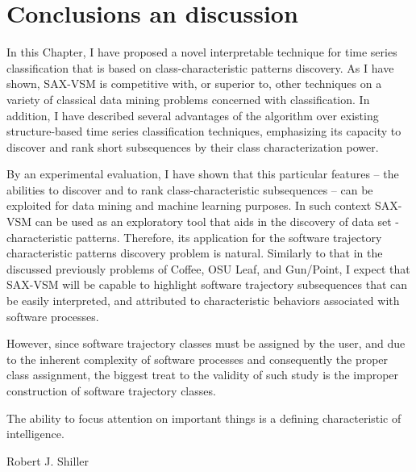 \section{Conclusions an discussion} \label{conclusion}
In this Chapter, I have proposed a novel interpretable technique for time series classification that 
is based on class-characteristic patterns discovery. As I have shown, SAX-VSM is competitive with, or 
superior to, other techniques on a variety of classical data mining problems concerned with classification. 
In addition, I have described several advantages of the algorithm over existing structure-based time series 
classification techniques, emphasizing its capacity to discover and rank short subsequences by their 
class characterization power. 

By an experimental evaluation, I have shown that this particular features 
-- the abilities to discover and to rank class-characteristic subsequences -- 
can be exploited for data mining and machine learning purposes. In such context SAX-VSM can be used as an 
exploratory tool that aids in the discovery of data set -characteristic patterns. 
Therefore, its application for the software trajectory characteristic patterns discovery problem is natural. 
Similarly to that in the discussed previously problems of Coffee, OSU Leaf, and Gun/Point, I expect that 
SAX-VSM will be capable to highlight software trajectory subsequences that can be easily interpreted, and 
attributed to characteristic behaviors associated with software processes.

However, since software trajectory classes must be assigned by the user, and due to the inherent complexity 
of software processes and consequently the proper class assignment, the biggest treat to the validity of 
such study is the improper construction of software trajectory classes.

\epigraph{The ability to focus attention on important things is a defining characteristic of 
intelligence.}{Robert J. Shiller}
